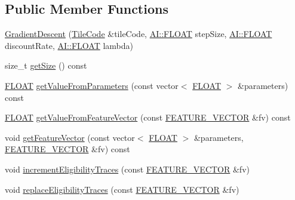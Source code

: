 \subsection*{Public Member Functions}
\begin{DoxyCompactItemize}
\item 
\hyperlink{classAI_1_1Algorithm_1_1GradientDescent_a8432f6a139bfac60422558841e6b79ad}{Gradient\+Descent} (\hyperlink{classAI_1_1Algorithm_1_1TileCode}{Tile\+Code} \&tile\+Code, \hyperlink{namespaceAI_a41b74884a20833db653dded3918e05c3}{A\+I\+::\+F\+L\+O\+A\+T} step\+Size, \hyperlink{namespaceAI_a41b74884a20833db653dded3918e05c3}{A\+I\+::\+F\+L\+O\+A\+T} discount\+Rate, \hyperlink{namespaceAI_a41b74884a20833db653dded3918e05c3}{A\+I\+::\+F\+L\+O\+A\+T} lambda)
\item 
size\+\_\+t \hyperlink{classAI_1_1Algorithm_1_1GradientDescent_a04a6c7f4c2e0046dd70b2cfd98322971}{get\+Size} () const 
\item 
\hyperlink{namespaceAI_a41b74884a20833db653dded3918e05c3}{F\+L\+O\+A\+T} \hyperlink{classAI_1_1Algorithm_1_1GradientDescent_a8dcc60ebf28babbe120fe7b20334380f}{get\+Value\+From\+Parameters} (const vector$<$ \hyperlink{namespaceAI_a41b74884a20833db653dded3918e05c3}{F\+L\+O\+A\+T} $>$ \&parameters) const 
\item 
\hyperlink{namespaceAI_a41b74884a20833db653dded3918e05c3}{F\+L\+O\+A\+T} \hyperlink{classAI_1_1Algorithm_1_1GradientDescent_a19111aa6a83836a2e12e623e4004c4d3}{get\+Value\+From\+Feature\+Vector} (const \hyperlink{namespaceAI_a23a39e1b301a5c1345fa508796940631}{F\+E\+A\+T\+U\+R\+E\+\_\+\+V\+E\+C\+T\+O\+R} \&fv) const 
\item 
void \hyperlink{classAI_1_1Algorithm_1_1GradientDescent_a6a625b771afbda36509c2b38843825bf}{get\+Feature\+Vector} (const vector$<$ \hyperlink{namespaceAI_a41b74884a20833db653dded3918e05c3}{F\+L\+O\+A\+T} $>$ \&parameters, \hyperlink{namespaceAI_a23a39e1b301a5c1345fa508796940631}{F\+E\+A\+T\+U\+R\+E\+\_\+\+V\+E\+C\+T\+O\+R} \&fv) const 
\item 
void \hyperlink{classAI_1_1Algorithm_1_1GradientDescent_a68b6d1772a25ce2d6d98cfd3ab697b02}{increment\+Eligibility\+Traces} (const \hyperlink{namespaceAI_a23a39e1b301a5c1345fa508796940631}{F\+E\+A\+T\+U\+R\+E\+\_\+\+V\+E\+C\+T\+O\+R} \&fv)
\item 
void \hyperlink{classAI_1_1Algorithm_1_1GradientDescent_ae0038bf21f9576cfa0d24a942f0a6c5a}{replace\+Eligibility\+Traces} (const \hyperlink{namespaceAI_a23a39e1b301a5c1345fa508796940631}{F\+E\+A\+T\+U\+R\+E\+\_\+\+V\+E\+C\+T\+O\+R} \&fv)

\end{DoxyCompactItemize}

